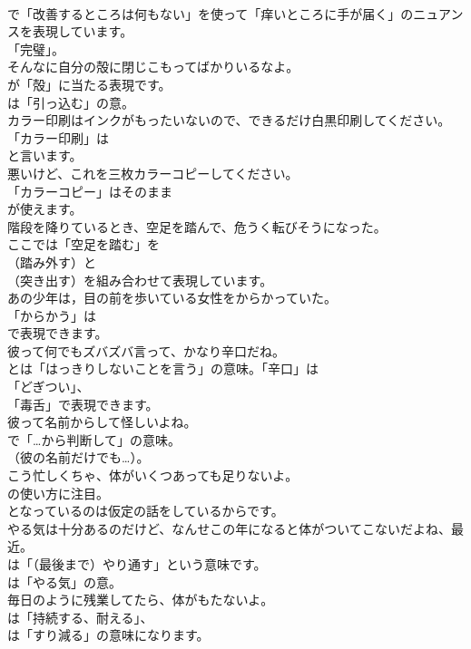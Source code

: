 \documentclass[8pt]{extreport}
\begin{document}
\begin{CJK}{UTF8}{min}
\\	で「改善するところは何もない」を使って「痒いところに手が届く」のニュアンスを表現しています。
\\	「完璧」。	
\\	そんなに自分の殻に閉じこもってばかりいるなよ。 
\\	が「殻」に当たる表現です。
\\	は「引っ込む」の意。	
\\	カラー印刷はインクがもったいないので、できるだけ白黒印刷してください。 
\\	「カラー印刷」は
\\	と言います。	
\\	悪いけど、これを三枚カラーコピーしてください。 
\\	「カラーコピー」はそのまま
\\	が使えます。	
\\	階段を降りているとき、空足を踏んで、危うく転びそうになった。 
\\	ここでは「空足を踏む」を
\\	（踏み外す）と
\\	（突き出す）を組み合わせて表現しています。	
\\	あの少年は，目の前を歩いている女性をからかっていた。 
\\	「からかう」は 
\\	で表現できます。	
\\	彼って何でもズバズバ言って、かなり辛口だね。 
\\	とは「はっきりしないことを言う」の意味。「辛口」は
\\	「どぎつい」、
\\	「毒舌」で表現できます。	
\\	彼って名前からして怪しいよね。 
\\	で「…から判断して」の意味。
\\	（彼の名前だけでも…）。	
\\	こう忙しくちゃ、体がいくつあっても足りないよ。 
\\	の使い方に注目。
\\	となっているのは仮定の話をしているからです。	
\\	やる気は十分あるのだけど、なんせこの年になると体がついてこないだよね、最近。 
\\	は「（最後まで）やり通す」という意味です。
\\	は「やる気」の意。	
\\	毎日のように残業してたら、体がもたないよ。 
\\	は「持続する、耐える」、
\\	は「すり減る」の意味になります。	

\end{CJK}
\end{document}
